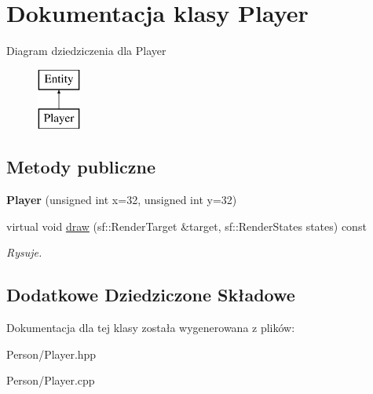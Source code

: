 \hypertarget{class_player}{\section{Dokumentacja klasy Player}
\label{class_player}
}
Diagram dziedziczenia dla Player\begin{figure}[H]
\begin{center}
\leavevmode
\includegraphics[height=2.000000cm]{class_player}
\end{center}
\end{figure}
\subsection*{Metody publiczne}
\begin{DoxyCompactItemize}
\item 
\hypertarget{class_player_a5baa80c8e1e1cb40e079f28b54b30083}{{\bfseries Player} (unsigned int x=32, unsigned int y=32)}\label{class_player_a5baa80c8e1e1cb40e079f28b54b30083}

\item 
\hypertarget{class_player_a4dd683b1db6aae2f58d23889ff752ad0}{virtual void \hyperlink{class_player_a4dd683b1db6aae2f58d23889ff752ad0}{draw} (sf\-::\-Render\-Target \&target, sf\-::\-Render\-States states) const }\label{class_player_a4dd683b1db6aae2f58d23889ff752ad0}

\begin{DoxyCompactList}\small\item\em Rysuje. \end{DoxyCompactList}\end{DoxyCompactItemize}
\subsection*{Dodatkowe Dziedziczone Składowe}


Dokumentacja dla tej klasy została wygenerowana z plików\-:\begin{DoxyCompactItemize}
\item 
Person/Player.\-hpp\item 
Person/Player.\-cpp\end{DoxyCompactItemize}
